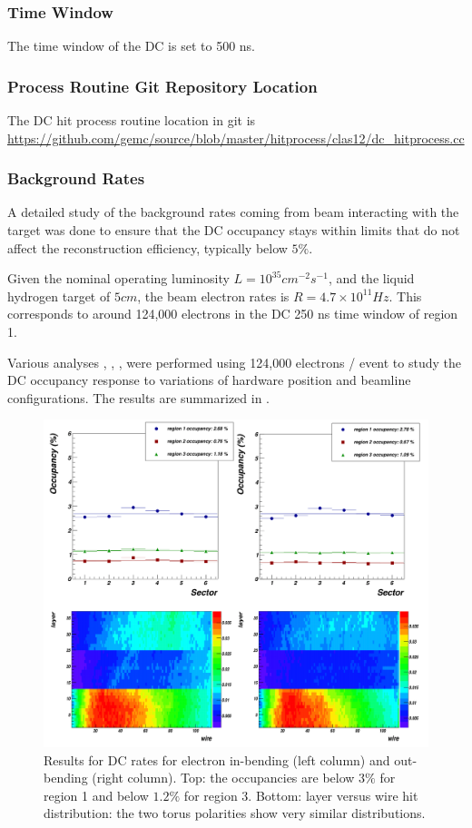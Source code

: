 \subsubsection{Time Window}

The time window  of the DC is set to 500 ns.

\subsubsection{Process Routine Git Repository Location}
The DC hit process routine location in git is \url{https://github.com/gemc/source/blob/master/hitprocess/clas12/dc_hitprocess.cc}


\subsubsection{Background Rates}

A detailed study of the background rates coming from beam interacting with the target was done to ensure that the DC occupancy stays
within limits that do not affect the reconstruction efficiency, typically below $5\%$.

Given the nominal operating luminosity $L=10^{35} cm^{-2}s^{-1}$, and the liquid hydrogen target of $5 cm$, the beam electron rates
is $R=4.7 \times 10^{11} Hz$. This corresponds to around 124,000 electrons in the DC 250 ns time window of region 1.

Various analyses \cite{targetStudy}, \cite{clas12Beamline}, \cite{clas12Background}, were performed using 124,000 electrons / event
to study the DC occupancy response to variations of hardware position and beamline configurations.
The results are summarized in .

\begin{figure}
	\centering
	\includegraphics[width=0.95\columnwidth,keepaspectratio]{img/dcOccupancy.png}
	\caption{Results for DC rates for electron in-bending (left column) and out-bending (right column).
				Top: the occupancies are below $3\%$ for region 1 and below $1.2\%$ for region 3. Bottom: layer
				versus wire hit distribution: the two torus polarities show very similar distributions.}
	\label{fig:dcOccupancy}
\end{figure}

